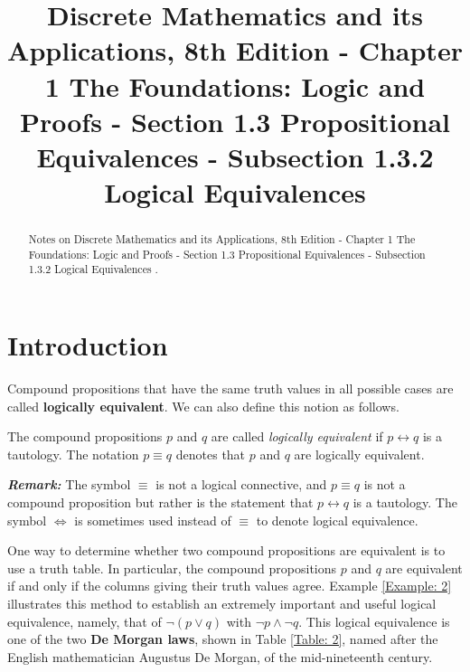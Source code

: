 \documentclass{Axon}
\title{Discrete Mathematics and its Applications, 8th Edition - Chapter 1 The Foundations: Logic and Proofs - Section 1.3 Propositional Equivalences - Subsection 1.3.2 Logical Equivalences}
\begin{document}
\maketitle
\makeauthor
\begin{abstract}
Notes on Discrete Mathematics and its Applications, 8th Edition - Chapter 1 The Foundations: Logic and Proofs - Section 1.3 Propositional Equivalences - Subsection 1.3.2 Logical Equivalences \cite{Rosen}.
\end{abstract}
\section{Introduction}
Compound propositions that have the same truth values in all possible cases are called \textbf{logically equivalent}. We can also define this notion as follows.

\begin{definition}
    The compound propositions \(p\) and \(q\) are called \textit{logically equivalent} if \(p \leftrightarrow q\) is a tautology. The notation \(p \equiv q\) denotes that \(p\) and \(q\) are logically equivalent.
\end{definition}

\textbf{\textit{Remark:}} The symbol \(\equiv\) is not a logical connective, and \(p \equiv q\) is not a compound proposition but rather is the statement that \(p \leftrightarrow q\) is a tautology. The symbol \(\Leftrightarrow\) is sometimes used instead of \(\equiv\) to denote logical equivalence.

One way to determine whether two compound propositions are equivalent is to use a truth table. In particular, the compound propositions \(p\) and \(q\) are equivalent if and only if the columns giving their truth values agree. Example \ref{Example: 2} illustrates this method to establish an extremely important and useful logical equivalence, namely, that of \(\lnot (p \lor q)\) with \(\lnot p \land \lnot q\). This logical equivalence is one of the two \textbf{De Morgan laws}, shown in Table \ref{Table: 2}, named after the English mathematician Augustus De Morgan, of the mid-nineteenth century.
\end{document}
